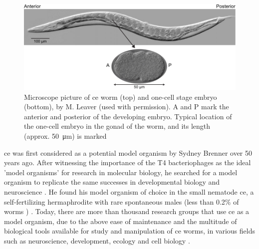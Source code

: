 \begin{figure}[h]
    \centering
    \includegraphics{Introduction/FigureWorm/worm.pdf}
    \caption[\acs{ce} worm and one-cell embryo]{Microscope picture of \acs{ce} worm (top) and one-cell stage embryo (bottom), by M. Leaver (used with permission). A and P mark the anterior and posterior of the developing embryo. Typical location of the one-cell embryo in the gonad of the worm, and its length (approx. \SI{50}{\micro\meter}) is marked}
    \label{fig:celegansWormModelOrganism}
\end{figure}

\ac{ce} was first considered as a potential model organism by Sydney Brenner over 50 years ago. After witnessing the importance of the T4 bacteriophages as the ideal 'model organisms' for research in molecular biology, he searched for a model organism to replicate the same successes in developmental biology and neuroscience \citep{wb1988nematode,brenner1974genetics,brenner2003nature}. He found his model organism of choice in the small nematode \ac{ce}, a self-fertilizing hermaphrodite with rare spontaneous males (less than \num{0.2}\% of worms \citep{haag2005evolution,corsi2015transparent}) \citep{brenner1974genetics}. Today, there are more than thousand research groups that use \ac{ce} as a model organism, due to the above ease of maintenance and the multitude of biological tools available for study and manipulation of \ac{ce} worms, in various fields such as neuroscience, development, ecology and cell biology \citep{corsi2015transparent}.

